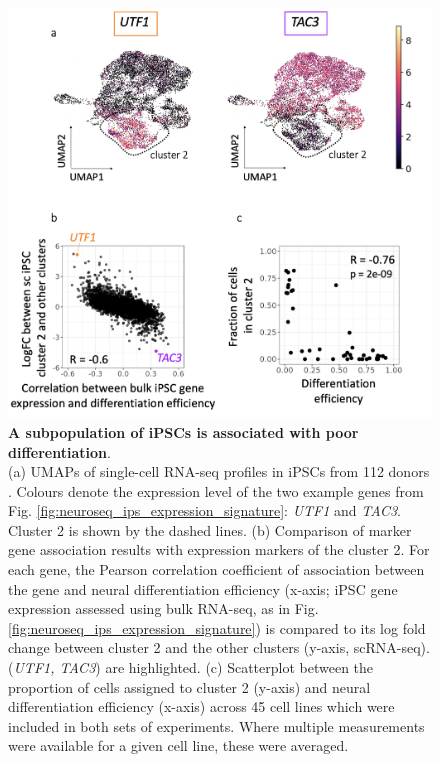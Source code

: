 \begin{figure}[htbp]
\centering
\includegraphics[width=14cm]{Chapter5/Fig/neuroseq_ips_sc_genes.png}
\caption[An iPSC subpopulation is linked to poor differentiation]{\textbf{A subpopulation of iPSCs is associated with poor differentiation}.\\
(a) UMAPs of single-cell RNA-seq profiles in iPSCs from 112 donors \cite{cuomo2020single}.
Colours denote the expression level of the two example genes from Fig. \ref{fig:neuroseq_ips_expression_signature}: \textit{UTF1} and \textit{TAC3}. 
Cluster 2 is shown by the dashed lines. 
(b) Comparison of marker gene association results with expression markers of the cluster 2. For each gene, the Pearson correlation coefficient of association between the gene and neural differentiation efficiency (x-axis; iPSC gene expression assessed using bulk RNA-seq, as in Fig. \ref{fig:neuroseq_ips_expression_signature}) is compared to its log fold change between cluster 2 and the other clusters (y-axis, scRNA-seq).
(\textit{UTF1, TAC3}) are highlighted. 
(c) Scatterplot between the proportion of cells assigned to cluster 2 (y-axis) and neural differentiation efficiency (x-axis) across 45 cell lines which were included in both sets of experiments. 
Where multiple measurements were available for a given cell line, these were averaged.}
\label{fig:neuroseq_ips_sc_genes}
\end{figure}

